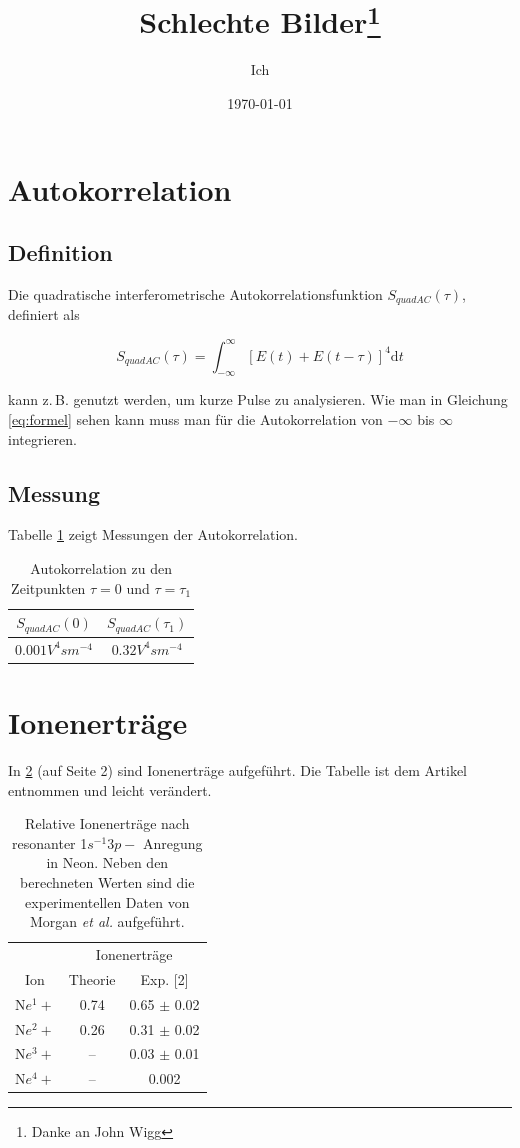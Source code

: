 \documentclass[a4paper, 10pt,onecolumn]{scrartcl}
\title{Schlechte Bilder\thanks{Danke an John Wigg}}
\author{Ich} %
\date{\today}
\begin{document}
\tableofcontents
\listoffigures
\listoftables

\section{Autokorrelation }
\subsection{Definition}

Die quadratische interferometrische Autokorrelationsfunktion $S_{quadAC}(\tau)$, definiert als
\begin{center}
	\begin{equation}
		S_{quadAC}(\tau)=\int_{-\infty}^{\infty}[E(t)+E(t-\tau)]^4\mathrm{d}t
		\label{eq:formel}
	\end{equation}
\end{center}
kann z.\,B. genutzt werden, um kurze Pulse zu analysieren. Wie man in Gleichung \eqref{eq:formel} sehen kann muss man für die Autokorrelation von $-\infty$ bis $\infty$ integrieren.

\subsection{Messung}
Tabelle \ref{Tabelle1} zeigt Messungen der Autokorrelation.
\begin{table}[h!]
\centering
\caption{Autokorrelation zu den Zeitpunkten $\tau =0$  und $\tau=\tau_1$}
\label{Tabelle1}
\begin{tabular}{|c|c|}
\hline \hline
$S_{quadAC}(0)$ & $S_{quadAC}(\tau_1)$\\ \hline
$0.001 V^4sm^{-4}$ & $0.32 V^4sm^{-4}$\\ \hline \hline
\end{tabular}
\end{table}
\section{Ionenerträge}

In \ref{Tabelle2} (auf Seite 2) sind Ionenerträge aufgeführt. Die Tabelle ist dem Artikel \cite{Stock} entnommen und leicht verändert.

\begin{table}[!h]
\centering
\caption{Relative Ionenerträge nach resonanter 1$s^{-1}3p-$ Anregung in Neon. Neben den berechneten Werten sind die experimentellen Daten von Morgan \textit{et al.} \cite{Morgan} aufgeführt.}
\label{Tabelle2}
\begin{tabular}{ccc}
\hline \hline
&\multicolumn{2}{c}{Ionenerträge}\\ \cline{2-3}
Ion & Theorie & Exp. [2] \\ \hline
N$e^1+$ & 0.74 & 0.65 $\pm$ 0.02\\
N$e^2+$ & 0.26 & 0.31 $\pm$ 0.02 \\ 
N$e^3+$ & -- & 0.03 $\pm$ 0.01\\
N$e^4+$ & -- & 0.002\\
\hline \hline

\end{tabular}
\end{table}
\end{document}
